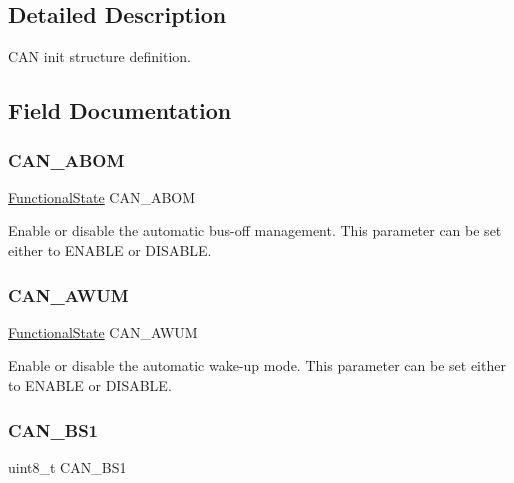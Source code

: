 \subsection{Detailed Description}
C\+AN init structure definition. 

\subsection{Field Documentation}
\mbox{\label{struct_c_a_n___init_type_def_a35b9420322c66febde319a638354e596}} 
\subsubsection{\texorpdfstring{CAN\_ABOM}{CAN\_ABOM}}
{\footnotesize\ttfamily \mbox{\hyperlink{group___exported__types_gac9a7e9a35d2513ec15c3b537aaa4fba1}{Functional\+State}} C\+A\+N\+\_\+\+A\+B\+OM}

Enable or disable the automatic bus-\/off management. This parameter can be set either to E\+N\+A\+B\+LE or D\+I\+S\+A\+B\+LE. \mbox{\label{struct_c_a_n___init_type_def_a8f5475c5b4c675c4662f62c23fd58097}} 
\subsubsection{\texorpdfstring{CAN\_AWUM}{CAN\_AWUM}}
{\footnotesize\ttfamily \mbox{\hyperlink{group___exported__types_gac9a7e9a35d2513ec15c3b537aaa4fba1}{Functional\+State}} C\+A\+N\+\_\+\+A\+W\+UM}

Enable or disable the automatic wake-\/up mode. This parameter can be set either to E\+N\+A\+B\+LE or D\+I\+S\+A\+B\+LE. \mbox{\label{struct_c_a_n___init_type_def_a6244c64f0e5ff7fb26d8aefb272787c5}} 
\subsubsection{\texorpdfstring{CAN\_BS1}{CAN\_BS1}}
{\footnotesize\ttfamily uint8\+\_\+t C\+A\+N\+\_\+\+B\+S1}

